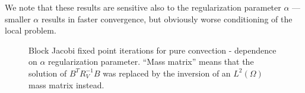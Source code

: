 \documentclass{article}
\newcommand{\LRp}[1]{\left( #1 \right)}
\renewcommand{\L}{L^2\LRp{\Omega}}
\begin{document}
We note that these results are sensitive also to the regularization parameter $\alpha$ --- smaller $\alpha$ results in faster convergence, but obviously worse conditioning of the local problem.  
\begin{figure}
\centering
{}
\caption{Block Jacobi fixed point iterations for pure convection - dependence on $\alpha$ regularization parameter.  ``Mass matrix'' means that the solution of $B^TR_V^{-1}B$ was replaced by the inversion of an $\L$ mass matrix instead.}
\end{figure}
%
%
%
\end{document}
